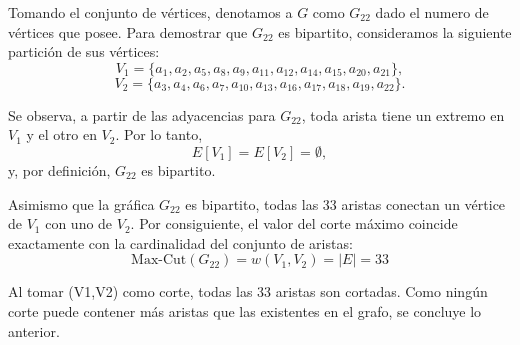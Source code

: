 \begin{itemize}
    
    Tomando el conjunto de vértices, denotamos a $G$ como $G_{22}$ dado el numero de vértices que posee. 
    Para demostrar que $G_{22}$ es bipartito, consideramos la siguiente partición de sus vértices:
\[
V_1 = \{a_1, a_2, a_5, a_8, a_9, a_{11}, a_{12}, a_{14}, a_{15}, a_{20}, a_{21}\},
\]
\[
V_2 = \{a_3, a_4, a_6, a_7, a_{10}, a_{13}, a_{16}, a_{17}, a_{18}, a_{19}, a_{22}\}.
\]

Se observa, a partir de las adyacencias para $G_{22}$, toda arista tiene un extremo en $V_1$ y el otro en $V_2$. Por lo tanto,
\[
E[V_1] = E[V_2] = \emptyset,
\]
y, por definición, $G_{22}$ es bipartito.
    
    Asimismo que la gráfica $G_{22}$ es bipartito, todas las 33 aristas conectan un vértice de $V_1$ con uno de $V_2$. Por consiguiente, el valor del corte máximo coincide exactamente con la cardinalidad del conjunto de aristas:$$\text{Max-Cut}(G_{22}) = w(V_1, V_2) = \vert{}E\vert{} = 33$$
    
    Al tomar (V1,V2) como corte, todas las 33 aristas son cortadas. Como ningún corte puede contener más aristas que las existentes en el grafo, se concluye lo anterior. \cite{GODDARD2013839}
    
    \vspace{1cm}
\end{itemize}